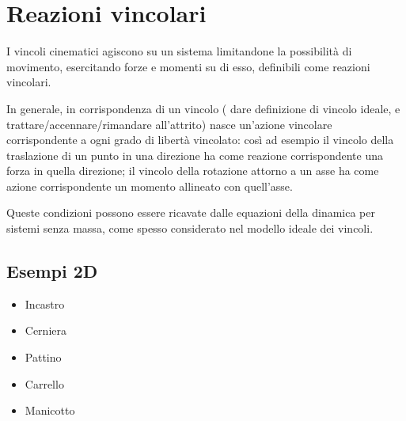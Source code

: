 \documentclass[letterpaper,10pt,english]{jupyterBook}
\begin{document}
\section{Reazioni vincolari}
\label{\detokenize{ch/actions-reactions:reazioni-vincolari}}\label{\detokenize{ch/actions-reactions:classical-mechanics-actions-reactions}}\label{\detokenize{ch/actions-reactions::doc}}
\sphinxAtStartPar
I vincoli cinematici agiscono su un sistema limitandone la possibilità di movimento, esercitando forze e momenti su di esso, definibili come reazioni vincolari.

\sphinxAtStartPar
In generale, in corrispondenza di un vincolo  ( dare definizione di vincolo ideale, e trattare/accennare/rimandare all’attrito) nasce un’azione vincolare corrispondente a ogni grado di libertà vincolato: così ad esempio il vincolo della traslazione di un punto in una direzione ha come reazione corrispondente una forza in quella direzione; il vincolo della rotazione attorno a un asse ha come azione corrispondente un momento allineato con quell’asse.

\sphinxAtStartPar
Queste condizioni possono essere ricavate dalle equazioni della dinamica per sistemi senza massa, come spesso considerato nel modello ideale dei vincoli.


\subsection{Esempi 2D}
\label{\detokenize{ch/actions-reactions:esempi-2d}}\begin{itemize}
\item {} 
\sphinxAtStartPar
Incastro

\item {} 
\sphinxAtStartPar
Cerniera

\item {} 
\sphinxAtStartPar
Pattino

\item {} 
\sphinxAtStartPar
Carrello

\item {} 
\sphinxAtStartPar
Manicotto

\end{itemize}
\end{document}
